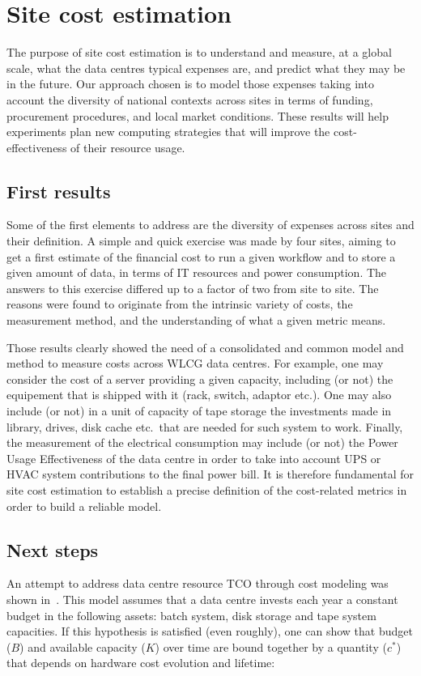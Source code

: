\section{Site cost estimation}
The purpose of site cost estimation is to understand and measure, at a
global scale, what the data centres typical expenses are, and predict
what they may be in the future. Our approach chosen is to model those
expenses taking into account the diversity of national contexts
across sites in terms of funding, procurement procedures, and local
market conditions.  These results will help experiments plan new
computing strategies that will improve the cost-effectiveness of their
resource usage.

\subsection{First results}
Some of the first elements to address are the diversity of expenses
across sites and their definition.  A simple and quick exercise was
made by four sites, aiming to get a first estimate of the financial
cost to run a given workflow and to store a given amount of data, in
terms of IT resources and power consumption.  The answers to this
exercise differed up to a factor of two from site to site.
The reasons were found to originate from the intrinsic variety of
costs, the measurement method, and the understanding of what a given
metric means.

Those results clearly showed the need of a consolidated and common
model and method to measure costs across WLCG data centres. For
example, one may consider the cost of a server providing a given
capacity, including (or not) the equipement that is shipped with it
(rack, switch, adaptor etc.).  One may also include (or not) in a unit
of capacity of tape storage the investments made in library, drives,
disk cache etc.\ that are needed for such system to work.  Finally,
the measurement of the electrical consumption may include (or not) the
Power Usage Effectiveness of the data centre in order to take into
account UPS or HVAC system contributions to the final power bill.  It
is therefore fundamental for site cost estimation to establish a
precise definition of the cost-related metrics in order to build a
reliable model.

\subsection{Next steps}
An attempt to address data centre resource TCO through cost modeling
was shown in~\cite{costmodel}. This model assumes that a data centre
invests each year a constant budget in the following assets:
batch system, disk storage and tape system capacities. If this
hypothesis is satisfied (even roughly), one can show that budget ($B$)
and available capacity ($K$) over time are bound together by a
quantity ($c^*$) that depends on hardware cost evolution and lifetime:

